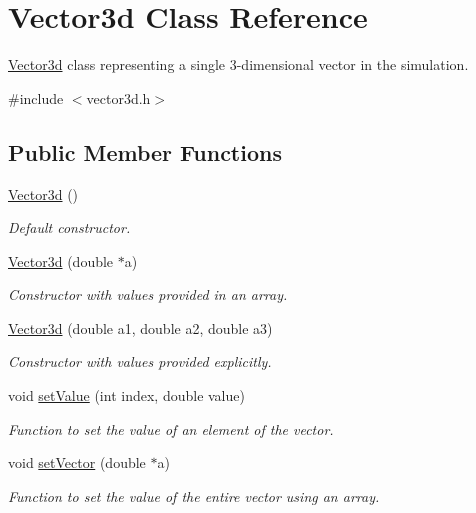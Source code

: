 \hypertarget{classVector3d}{\section{Vector3d Class Reference}
\label{df/dd0/classVector3d}
}


\hyperlink{classVector3d}{Vector3d} class representing a single 3-\/dimensional vector in the simulation.  




{\ttfamily \#include $<$vector3d.\-h$>$}

\subsection*{Public Member Functions}
\begin{DoxyCompactItemize}
\item 
\hyperlink{classVector3d_aac098d8695c4288e4844835e62945244}{Vector3d} ()
\begin{DoxyCompactList}\small\item\em Default constructor. \end{DoxyCompactList}\item 
\hyperlink{classVector3d_a9e5a8c606f27fe366d2075f6bc4759a6}{Vector3d} (double $\ast$a)
\begin{DoxyCompactList}\small\item\em Constructor with values provided in an array. \end{DoxyCompactList}\item 
\hyperlink{classVector3d_af61756bf2e679ccf2a5c0fd742ae3e6c}{Vector3d} (double a1, double a2, double a3)
\begin{DoxyCompactList}\small\item\em Constructor with values provided explicitly. \end{DoxyCompactList}\item 
void \hyperlink{classVector3d_ac20e0cda09c96f83cc41e23300c303ca}{set\-Value} (int index, double value)
\begin{DoxyCompactList}\small\item\em Function to set the value of an element of the vector. \end{DoxyCompactList}\item 
void \hyperlink{classVector3d_a82c251f7203e08ec50ea55222f40525f}{set\-Vector} (double $\ast$a)
\begin{DoxyCompactList}\small\item\em Function to set the value of the entire vector using an array. \end{DoxyCompactList}\item 

\end{DoxyCompactItemize}
